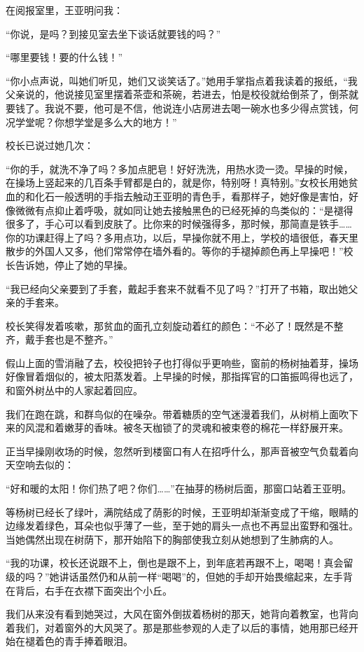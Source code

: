 \par 在阅报室里，王亚明问我：
\par “你说，是吗？到接见室去坐下谈话就要钱的吗？”
\par “哪里要钱！要的什么钱！”
\par “你小点声说，叫她们听见，她们又谈笑话了。”她用手掌指点着我读着的报纸，“我父亲说的，他说接见室里摆着茶壶和茶碗，若进去，怕是校役就给倒茶了，倒茶就要钱了。我说不要，他可是不信，他说连小店房进去喝一碗水也多少得点赏钱，何况学堂呢？你想学堂是多么大的地方！”
\par 校长已说过她几次：
\par “你的手，就洗不净了吗？多加点肥皂！好好洗洗，用热水烫一烫。早操的时候，在操场上竖起来的几百条手臂都是白的，就是你，特别呀！真特别。”女校长用她贫血的和化石一般透明的手指去触动王亚明的青色手，看那样子，她好像是害怕，好像微微有点抑止着呼吸，就如同让她去接触黑色的已经死掉的鸟类似的：“是褪得很多了，手心可以看到皮肤了。比你来的时候强得多，那时候，那简直是铁手……你的功课赶得上了吗？多用点功，以后，早操你就不用上，学校的墙很低，春天里散步的外国人又多，他们常常停在墙外看的。等你的手褪掉颜色再上早操吧！”校长告诉她，停止了她的早操。
\par “我已经向父亲要到了手套，戴起手套来不就看不见了吗？”打开了书箱，取出她父亲的手套来。
\par 校长笑得发着咳嗽，那贫血的面孔立刻旋动着红的颜色：“不必了！既然是不整齐，戴手套也是不整齐。”
\par 假山上面的雪消融了去，校役把铃子也打得似乎更响些，窗前的杨树抽着芽，操场好像冒着烟似的，被太阳蒸发着。上早操的时候，那指挥官的口笛振鸣得也远了，和窗外树丛中的人家起着回应。
\par 我们在跑在跳，和群鸟似的在噪杂。带着糖质的空气迷漫着我们，从树梢上面吹下来的风混和着嫩芽的香味。被冬天枷锁了的灵魂和被束卷的棉花一样舒展开来。
\par 正当早操刚收场的时候，忽然听到楼窗口有人在招呼什么，那声音被空气负载着向天空响去似的：
\par “好和暖的太阳！你们热了吧？你们……”在抽芽的杨树后面，那窗口站着王亚明。
\par 等杨树已经长了绿叶，满院结成了荫影的时候，王亚明却渐渐变成了干缩，眼睛的边缘发着绿色，耳朵也似乎薄了一些，至于她的肩头一点也不再显出蛮野和强壮。当她偶然出现在树荫下，那开始陷下的胸部使我立刻从她想到了生肺病的人。
\par “我的功课，校长还说跟不上，倒也是跟不上，到年底若再跟不上，喝喝！真会留级的吗？”她讲话虽然仍和从前一样“喝喝”的，但她的手却开始畏缩起来，左手背在背后，右手在衣襟下面突出个小丘。
\par 我们从来没有看到她哭过，大风在窗外倒拔着杨树的那天，她背向着教室，也背向着我们，对着窗外的大风哭了。那是那些参观的人走了以后的事情，她用那已经开始在褪着色的青手捧着眼泪。
